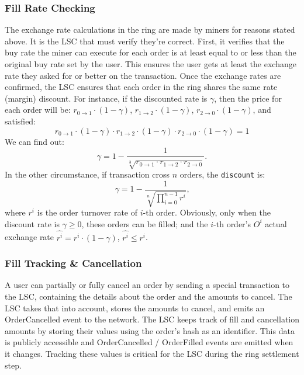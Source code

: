 \documentclass[UTF8,nofonts]{article}
\begin{document}
\subsubsection{Fill Rate Checking}
The exchange rate calculations in the ring are made by miners for reasons stated above. It is the LSC that must verify they're correct. First, it verifies that the buy rate the miner can execute for each order is at least equal to or less than the original buy rate set by the user. This ensures the user gets at least the exchange rate they asked for or better on the transaction. Once the exchange rates are confirmed, the LSC ensures that each order in the ring shares the same rate (margin) discount. For instance, if the discounted rate is $\gamma$, then the price for each order will be:
$r_{0\rightarrow 1} \cdot (1-\gamma)$, $r_{1\rightarrow 2} \cdot (1-\gamma)$, $r_{2 \rightarrow 0} \cdot (1-\gamma)$, and satisfied: 
\begin{equation}
r_{0\rightarrow 1} \cdot (1-\gamma)\cdot r_{1\rightarrow 2} \cdot (1-\gamma) \cdot r_{2 \rightarrow 0} \cdot (1-\gamma) = 1
\end{equation}
We can find out: 
\begin{equation*}
\gamma = 1- \frac{1}{\sqrt[3]{r_{0\rightarrow 1} \cdot r_{1\rightarrow 2} \cdot r_{2\rightarrow 0}}}\text{.}
\end{equation*}
In the other circumstance, if transaction cross $n$ orders, the \texttt{discount} is: 
\begin{equation*}
\gamma = 1- \frac{1}{\sqrt[n]{\prod_{i=0}^{n-1} r^i}} \text{,}
\end{equation*}
where $r^i$ is the order turnover rate of $i$-th order. Obviously, only when the discount rate is $\gamma \ge 0$, these orders can be filled; and the $i$-th order's $O^i$ actual exchange rate $\hat{r^i} = r^i \cdot (1-\gamma)$, $\hat{r^i}\le r^i$.

\subsubsection{Fill Tracking \& Cancellation}
A user can partially or fully cancel an order by sending a special transaction to the LSC, containing the details about the order and the amounts to cancel. The LSC takes that into account, stores the amounts to cancel, and emits an OrderCancelled event to the network. The LSC keeps track of fill and cancellation amounts by storing their values using the order's hash as an identifier. This data is publicly accessible and OrderCancelled / OrderFilled events are emitted when it changes. Tracking these values is critical for the LSC during the ring settlement step.
\end{document}
